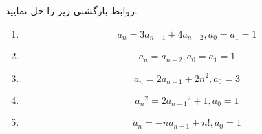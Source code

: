 \EXERCISE
روابط بازگشتی زیر را حل نمایید.
\begin{enumerate}
\item
$$a_n = 3a_{n-1} + 4a_{n-2}, a_0 = a_1 = 1$$
\item
$$a_n = a_{n-2}, a_0 = a_1 = 1$$
\item
$$a_n = 2a_{n-1} + 2n^2, a_0 = 3$$
\item
$${a_n}^2 = 2{a_{n-1}}^2 + 1, a_0 = 1$$
\item
$$a_n = -na_{n-1} + n!, a_0 = 1$$
\end{enumerate}
